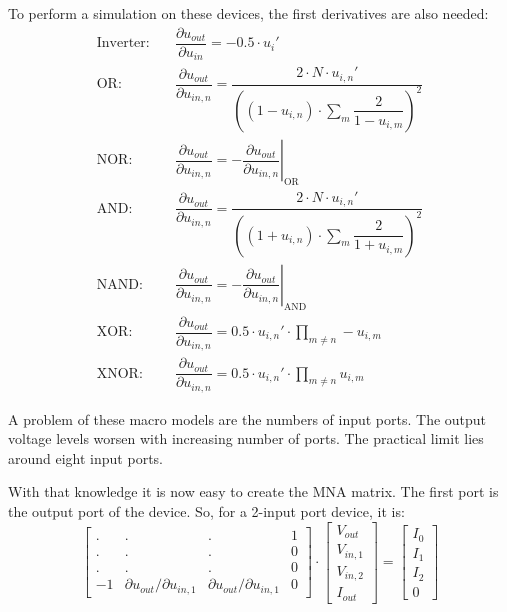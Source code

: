 To perform a simulation on these devices, the first derivatives are also
needed:
\begin{align}
\text{Inverter:} \quad & \dfrac{\partial u_{out}}{\partial u_{in}}
        =  -0.5\cdot u_i' \\
\text{OR:} \quad & \dfrac{\partial u_{out}}{\partial u_{in,n}}
  = \dfrac{2\cdot N\cdot u_{i,n}'}{\left( (1-u_{i,n})\cdot\sum\limits_m \dfrac{2}{1-u_{i,m}} \right)^2} \\
\text{NOR:} \quad & \dfrac{\partial u_{out}}{\partial u_{in,n}}
  = - \left.\dfrac{\partial u_{out}}{\partial u_{in,n}}\right|_{\text{OR}} \\
\text{AND:} \quad & \dfrac{\partial u_{out}}{\partial u_{in,n}}
  = \dfrac{2\cdot N\cdot u_{i,n}'}{\left( (1+u_{i,n})\cdot\sum\limits_m \dfrac{2}{1+u_{i,m}} \right)^2} \\
\text{NAND:} \quad & \dfrac{\partial u_{out}}{\partial u_{in,n}}
  = - \left.\dfrac{\partial u_{out}}{\partial u_{in,n}}\right|_{\text{AND}} \\
\text{XOR:} \quad & \dfrac{\partial u_{out}}{\partial u_{in,n}}
  = 0.5\cdot u_{i,n}' \cdot\prod_{m\ne n} -u_{i,m} \\
\text{XNOR:} \quad & \dfrac{\partial u_{out}}{\partial u_{in,n}}
  = 0.5\cdot u_{i,n}' \cdot\prod_{m\ne n} u_{i,m}
\end{align}

A problem of these macro models are the numbers of input ports.
The output voltage levels worsen with increasing number of ports.
The practical limit lies around eight input ports.

\addvspace{12pt}

With that knowledge it is now easy to create the MNA matrix.  The
first port is the output port of the device.  So, for a 2-input port
device, it is:
\begin{equation}
\label{eq:DClogicMNA}
\begin{bmatrix}
.&.&.& 1\\
.&.&.& 0\\
.&.&.& 0\\
-1 & \partial u_{out}/ \partial u_{in,1} & \partial u_{out}/ \partial u_{in,1} & 0
\end{bmatrix}
\cdot
\begin{bmatrix}
V_{out}\\
V_{in,1}\\
V_{in,2}\\
I_{out}
\end{bmatrix}
=
\begin{bmatrix}
I_{0}\\
I_{1}\\
I_{2}\\
0
\end{bmatrix}
\end{equation}

